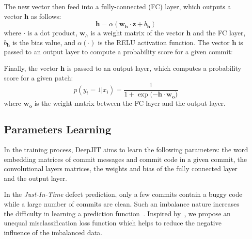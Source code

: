 The new vector then feed into a fully-connected (FC) layer, which outputs a vector $\textbf{h}$ as follows:
\begin{equation}  %
\label{eq:fully_layer}
\textbf{h} = \alpha(\textbf{w}_\textbf{h} \cdot \textbf{z} + b_\textbf{h})
\end{equation}
where $\cdot$ is a dot product, $\textbf{w}_h$ is a weight matrix of the vector $\textbf{h}$ and the FC layer, $b_\textbf{h}$ is the bias value, and $\alpha(\cdot)$ is the RELU activation function. The vector $\textbf{h}$ is passed to an output layer to compute a probability score for a given commit:


Finally, the vector $\mathbf{h}$ is passed to an output layer, which
computes a probability score for a given patch:
\begin{equation}  %
p(y_i=1|x_i) = \frac{1}{1 + \exp({-\textbf{h} \cdot \textbf{w}_\textbf{o})}}
\end{equation}
where $\textbf{w}_\textbf{o}$ is the weight matrix between the FC layer and the output layer.

\subsection{Parameters Learning}
\label{sec:learning_parameters}

In the training process, DeepJIT aims to learn the following parameters: the
word embedding matrices of commit messages and commit code in a given commit, the convolutional layers matrices, the weights and bias of
the fully connected layer and the output layer. 

In the \emph{Just-In-Time} defect prediction, only a few commits contain a buggy code while a large number of commits are clean. Such an imbalance nature increases the difficulty in learning a prediction function~\cite{chawla2004special}. Inspired by~\cite{zhou2006training, kukar1998cost}, we propose an unequal misclassification loss function which helps to reduce the negative influence of the imbalanced data. 

